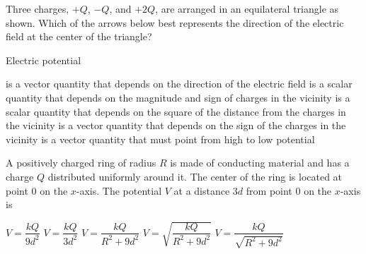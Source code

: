 \documentclass{../../oss-classkick-exam}
\begin{document}
\begin{questions}
\begin{multicols*}{2}
    \question Three charges, $+Q$, $-Q$, and $+2Q$, are arranged in an
    equilateral triangle as shown. Which of the arrows below best represents the
    direction of the electric field at the center of the triangle?
    \begin{center}
      \vspace{-.1in}
    \end{center}
    \begin{choices}
      \choice {\Huge$\downarrow$}
      \choice {\Huge$\uparrow$}
      \choice {\Huge$\searrow$}
      \choice {\Huge$\swarrow$}
      \choice {\Huge$\nearrow$}
    \end{choices}
    \columnbreak
    
    \question Electric potential
    \begin{choices}
      \choice is a vector quantity that depends on the direction of the electric
      field
      \choice is a scalar quantity that depends on the magnitude and sign of
      charges in the vicinity
      \choice is a scalar quantity that depends on the square of the distance
      from the charges in the vicinity
      \choice is a vector quantity that depends on the sign of the charges in
      the vicinity
      \choice is a vector quantity that must point from high to low potential
    \end{choices}
    \vspace{.7in}
   
    \question A positively charged ring of radius $R$ is made of conducting
    material and has a charge $Q$ distributed uniformly around it. The center of
    the ring is located at point $0$ on the $x$-axis. The potential $V$ at a
    distance $3d$ from point $0$ on the $x$-axis is
    \begin{center}
    \end{center}
    \begin{choices}
      \choice $V=\dfrac{kQ}{9d^2}$
      \choice $V=\dfrac{kQ}{3d^2}$
      \choice $V=\dfrac{kQ}{R^2+9d^2}$
      \choice $V=\sqrt{\dfrac{kQ}{R^2+9d^2}}$
      \choice $V=\dfrac{kQ}{\sqrt{R^2+9d^2}}$
    \end{choices}
    \columnbreak
  

\end{multicols*}
\end{questions}
\end{document}
